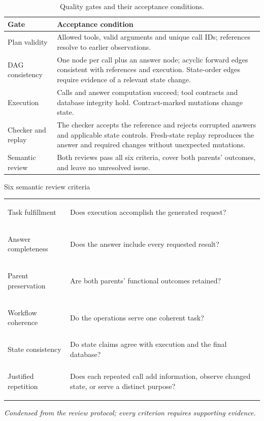 \begin{table}[H]
\centering\small
\caption{Quality gates and their acceptance conditions.}
\label{tab:synthesis-gates}
\renewcommand{\arraystretch}{1.17}
\begin{tabularx}{\linewidth}{@{}>{\raggedright\arraybackslash}p{.19\linewidth}Y@{}}
\toprule
Gate & Acceptance condition \\
\midrule
Plan validity & Allowed tools, valid arguments and unique call IDs; references resolve to earlier observations. \\
DAG consistency & One node per call plus an answer node; acyclic forward edges consistent with references and execution. State-order edges require evidence of a relevant state change. \\
Execution & Calls and answer computation succeed; tool contracts and database integrity hold. Contract-marked mutations change state. \\
Checker and replay & The checker accepts the reference and rejects corrupted answers and applicable state controls. Fresh-state replay reproduces the answer and required changes without unexpected mutations. \\
Semantic review & Both reviews pass all six criteria, cover both parents' outcomes, and leave no unresolved issue. \\
\bottomrule
\end{tabularx}
\end{table}

\begin{systembox}{Six semantic review criteria}
\setlength{\tabcolsep}{0pt}\renewcommand{\arraystretch}{1.2}
\begin{tabularx}{\linewidth}{@{}>{\bfseries\raggedright\arraybackslash}p{.32\linewidth}Y@{}}
Task fulfillment & Does execution accomplish the generated request? \\
Answer completeness & Does the answer include every requested result? \\
Parent preservation & Are both parents' functional outcomes retained? \\
Workflow coherence & Do the operations serve one coherent task? \\
State consistency & Do state claims agree with execution and the final database? \\
Justified repetition & Does each repeated call add information, observe changed state, or serve a distinct purpose? \\
\end{tabularx}
\smallskip
\textit{Condensed from the review protocol; every criterion requires supporting evidence.}
\end{systembox}


